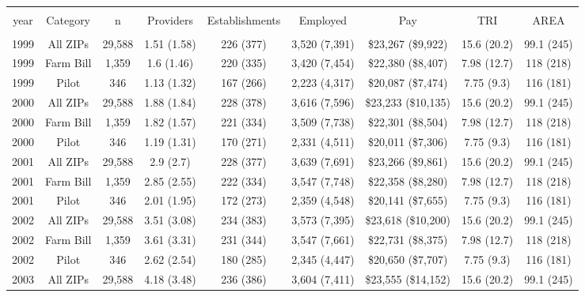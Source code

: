 
\begin{table}[!htbp] \centering 
  \caption{} 
  \label{} 
\begin{tabular}{@{\extracolsep{5pt}} ccccccccc} 
\\[-1.8ex]\hline 
\hline \\[-1.8ex] 
year & Category & n & Providers & Establishments & Employed & Pay & TRI & AREA \\ 
\hline \\[-1.8ex] 
1999 & All ZIPs & 29,588 & 1.51 (1.58) & 226 (377) & 3,520 (7,391) & \$23,267 (\$9,922) & 15.6 (20.2) & 99.1 (245) \\ 
1999 & Farm Bill & 1,359 & 1.6 (1.46) & 220 (335) & 3,420 (7,454) & \$22,380 (\$8,407) & 7.98 (12.7) & 118 (218) \\ 
1999 & Pilot & 346 & 1.13 (1.32) & 167 (266) & 2,223 (4,317) & \$20,087 (\$7,474) & 7.75 (9.3) & 116 (181) \\ 
2000 & All ZIPs & 29,588 & 1.88 (1.84) & 228 (378) & 3,616 (7,596) & \$23,233 (\$10,135) & 15.6 (20.2) & 99.1 (245) \\ 
2000 & Farm Bill & 1,359 & 1.82 (1.57) & 221 (334) & 3,509 (7,738) & \$22,301 (\$8,504) & 7.98 (12.7) & 118 (218) \\ 
2000 & Pilot & 346 & 1.19 (1.31) & 170 (271) & 2,331 (4,511) & \$20,011 (\$7,306) & 7.75 (9.3) & 116 (181) \\ 
2001 & All ZIPs & 29,588 & 2.9 (2.7) & 228 (377) & 3,639 (7,691) & \$23,266 (\$9,861) & 15.6 (20.2) & 99.1 (245) \\ 
2001 & Farm Bill & 1,359 & 2.85 (2.55) & 222 (334) & 3,547 (7,748) & \$22,358 (\$8,280) & 7.98 (12.7) & 118 (218) \\ 
2001 & Pilot & 346 & 2.01 (1.95) & 172 (273) & 2,359 (4,548) & \$20,141 (\$7,655) & 7.75 (9.3) & 116 (181) \\ 
2002 & All ZIPs & 29,588 & 3.51 (3.08) & 234 (383) & 3,573 (7,395) & \$23,618 (\$10,200) & 15.6 (20.2) & 99.1 (245) \\ 
2002 & Farm Bill & 1,359 & 3.61 (3.31) & 231 (344) & 3,547 (7,661) & \$22,731 (\$8,375) & 7.98 (12.7) & 118 (218) \\ 
2002 & Pilot & 346 & 2.62 (2.54) & 180 (285) & 2,345 (4,447) & \$20,650 (\$7,707) & 7.75 (9.3) & 116 (181) \\ 
2003 & All ZIPs & 29,588 & 4.18 (3.48) & 236 (386) & 3,604 (7,411) & \$23,555 (\$14,152) & 15.6 (20.2) & 99.1 (245) \\ 

\end{tabular}
\end{table}
